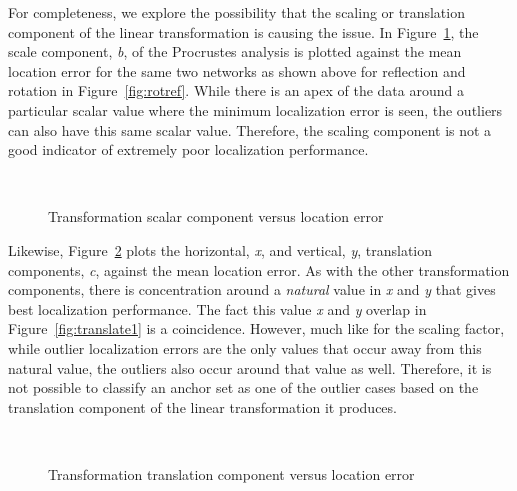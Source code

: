 For completeness, we explore the possibility that the scaling or translation component of the linear transformation is causing the issue.  In Figure~\ref{fig:scalar}, the scale component, \emph{b}, of the Procrustes analysis is plotted against the mean location error for the same two networks as shown above for reflection and rotation in Figure~\ref{fig:rotref}.  While there is an apex of the data around a particular scalar value where the minimum localization error is seen, the outliers can also have this same scalar value.  Therefore, the scaling component is not a good indicator of  extremely poor localization performance.

\begin{figure}
  \centering
\\
	\caption{Transformation scalar component versus location error}	
	\label{fig:scalar}
\end{figure}

Likewise, Figure~\ref{fig:translate} plots the horizontal, \emph{x}, and vertical, \emph{y}, translation components, \emph{c}, against the mean location error. As with the other transformation components, there is concentration around a \emph{natural} value in \emph{x} and \emph{y} that gives best localization performance.  The fact this value \emph{x} and \emph{y} overlap in Figure~\ref{fig:translate1} is a coincidence. However, much like for the scaling factor, while outlier localization errors are the only values that occur away from this natural value, the outliers also occur around that value as well.  Therefore, it is not possible to classify an anchor set as one of the outlier cases based on the translation component of the linear transformation it produces.

\begin{figure}
  \centering
\\
	\caption{Transformation translation component versus location error}	
	\label{fig:translate}
\end{figure}

